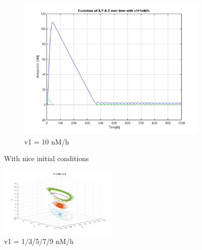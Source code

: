 \documentclass[10pt,a4paper,oneside,twocolumn]{article}
\numberwithin{equation}{section} %
\begin{document}
\begin{figure}
\begin{subfigure}[b]{0.32\textwidth}
	    \includegraphics[width=\textwidth]{LotsofthesameA/A-A10.png}
	    \caption{v1 = 10 nM/h}
	\end{subfigure}

	\caption{With nice initial conditions}
    \end{figure}

    \begin{figure}
	\centering
	    \includegraphics[width=0.5\textwidth]{A2.png}
	    \caption{v1 = 1/3/5/7/9 nM/h}
    \end{figure}
\end{document}
